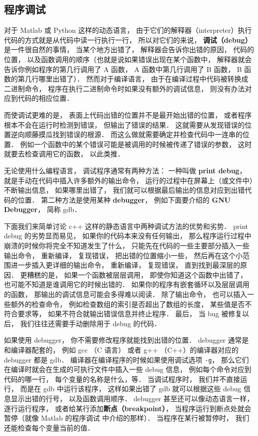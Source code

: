 
\subsection{程序调试}

对于 Matlab 或 Python 这样的动态语言， 由于它们的解释器（interpreter）执行代码的方式就是从代码中读一行执行一行， 所以对它们的来说， \textbf{调试（debug）}是一件很自然的事情， 当某个地方出错了， 解释器会告诉你出错的原因， 代码的位置， 以及函数调用的顺序（也就是说如果错误出现在某个函数中， 解释器就会告诉你例如程序的第几行调用了 A 函数， A 函数中第几行调用了 B 函数， B 函数的第几行哪里出错了）． 然而对于编译语言， 由于在编译过程中代码被转换成二进制命令， 程序在执行二进制命令时如果没有额外的调试信息， 则没有办法对应到代码的相应位置．

而使调试更难的是， 表面上代码出错的位置并不是最开始出错的位置， 或者程序根本不会在运行时检测到错误， 但输出了错误的结果． 这就需要从发现错误的位置逆向顺藤摸瓜找到错误的根源． 而这么做就需要确定并检查代码中一连串的位置． 例如一个函数中的某个错误可能是被调用的时候被传递了错误的参数， 这时就要去检查调用它的函数， 以此类推．

无论使用什么编程语言， 调试程序通常有两种方法： 一种叫做 \textbf{print debug}， 就是手动在代码中插入许多额外的输出命令， 运行的过程中在屏幕上（或文件中）不断输出信息， 如果哪里出错了， 我们就可以根据最后输出的信息对应到出错代码的位置． 第二种方法是使用某种 \textbf{debugger}， 例如下面要介绍的 \textbf{GNU Debugger}， 简称 gdb．

下面我们来简单讨论 c++ 这样的静态语言中两种调试方法的优势和劣势． print debug 的劣势显而易见， 如果你的代码本来没有任何输出， 那么程序运行过程中崩溃的时候你将完全不知道发生了什么， 只能先在代码的一些主要部分插入一些输出命令， 重新编译， 复现错误， 把出错的位置缩小一些， 然后再在这个小范围进一步插入更详细的输出命令， 重新编译， 复现错误， 直到找到最深层的原因． 更糟糕的是， 如果一个函数被层层调用， 即使你知道这个函数中出错了， 也可能不知道是谁调用它的时候出错的． 如果你的程序有嵌套循环以及层层调用的函数， 那输出的调试信息可能会多得难以阅读． 除了输出命令， 也可以插入一些额外的检查命令， 例如检查数组的索引是否超出了数组的长度， 某些值是否不符合要求等， 如果不符合就输出错误信息并终止程序． 最后， 当 bug 被修复以后， 我们往往还需要手动删除用于 debug 的代码．

如果使用 debugger， 你不需要修改程序就能找到出错的位置． debugger 通常是和编译器配套的， 例如 gcc （C 语言） 或者 g++ （C++）的编译器对应的 debugger 都是 gdb． 编译器在编译程序的时候如果使用调试选项 \verb|-g|， 那么它们在编译时就会在生成的可执行文件中插入一些 debug 信息， 例如每个命令对应到代码的哪一行， 每个变量的名称是什么，等． 当调试程序时， 我们并不直接运行， 而是在 gdb 中运行该程序， 这样如果出错了 gdb 就可以根据这些 debug 信息显示出错的行号， 以及函数调用顺序． debugger 甚至还可以像动态语言一样， 逐行运行程序， 或者给某行添加\textbf{断点（breakpoint）}， 当程序运行到断点处就会暂停（就像 Matlab 的程序调试 中介绍的那样）． 当程序在某行被暂停时， 我们还能检查每个变量当前的值．

